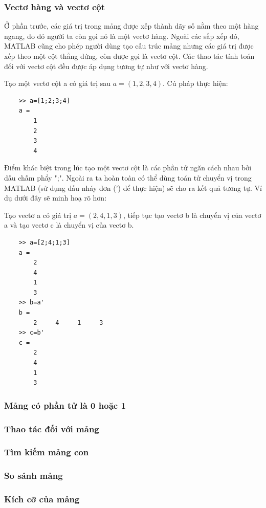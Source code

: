 \documentclass[12pt,a4paper]{article}
\begin{document}
\subsubsection{Vectơ hàng và vectơ cột}
Ở phần trước, các giá trị trong mảng được xếp thành dãy số nằm theo một hàng ngang, do đó người ta còn gọi nó là một vectơ hàng. Ngoài các sắp xếp đó, MATLAB cũng cho phép người dùng tạo cấu trúc mảng nhưng các giá trị được xếp theo một cột thẳng đứng, còn được gọi là vectơ cột. Các thao tác tính toán đối với vectơ cột đều được áp dụng tương tự như với vectơ hàng.
\begin{example}
Tạo một vectơ cột a có giá trị sau $a=(1,2,3,4)$. Cú pháp thực hiện:
\begin{lstlisting}
	>> a=[1;2;3;4]
	a =
     	1
     	2
     	3
     	4
\end{lstlisting}
\end{example}
Điểm khác biệt trong lúc tạo một vectơ cột là các phần tử ngăn cách nhau bởi dấu chấm phẩy ";". Ngoài ra ta hoàn toàn có thể dùng toán tử chuyển vị trong MATLAB (sử dụng dấu nháy đơn (') để thực hiện) sẽ cho ra kết quả tương tự. Ví dụ dưới đây sẽ minh hoạ rõ hơn:
\begin{example}
Tạo vectơ a có giá trị $a=(2,4,1,3)$, tiếp tục tạo vectơ b là chuyển vị của vectơ a và tạo vectơ c là chuyển vị của vectơ b.
\begin{lstlisting}
	>> a=[2;4;1;3]
	a =
     	2
     	4
     	1
     	3
	>> b=a'
	b =
     	2     4     1     3
	>> c=b'
	c =
     	2
     	4
     	1
     	3
\end{lstlisting}
\end{example}

\subsubsection{Mảng có phần tử là 0 hoặc 1}
\subsubsection{Thao tác đối với mảng}
\subsubsection{Tìm kiếm mảng con}
\subsubsection{So sánh mảng}
\subsubsection{Kích cỡ của mảng}
\end{document}
